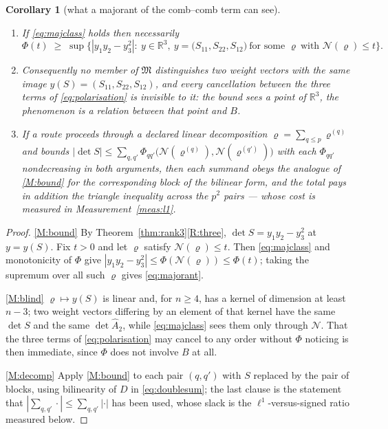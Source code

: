 \documentclass[11pt,a4paper]{article}
\theoremstyle{plain}
\newtheorem{corollary}[theorem]{Corollary}
\theoremstyle{definition}
\newcommand{\R}{\mathbb{R}}
\newcommand{\Ah}{\widehat{A}}
\begin{document}
\begin{corollary}[what a majorant of the comb--comb term can see]
\label{cor:majorant}
\begin{enumerate}[label=\textup{(\roman*)},leftmargin=2.6em]
\item\label{M:bound} If \eqref{eq:majclass} holds then necessarily
\begin{equation}
\label{eq:majorant}
  \Phi(t)\;\ge\;\sup\bigl\{|y_1y_2-y_3^{2}|:\ y\in\R^{3},\
  y=\bigl(S_{11},S_{22},S_{12}\bigr)\ \text{for some }\varrho\ \text{with }
  \mathcal N(\varrho)\le t\bigr\}.
\end{equation}
\item\label{M:blind} Consequently no member of $\mathfrak M$ distinguishes two
  weight vectors with the same image $y(S)=(S_{11},S_{22},S_{12})$, and every
  cancellation between the three terms of \eqref{eq:polarisation} is invisible
  to it: the bound sees a point of $\R^{3}$, the phenomenon is a relation
  between that point and $B$.
\item\label{M:decomp} If a route proceeds through a declared linear
  decomposition $\varrho=\sum_{q\le p}\varrho^{(q)}$ and bounds
  $|\det S|\le\sum_{q,q'}\Phi_{qq'}\bigl(\mathcal N(\varrho^{(q)}),
  \mathcal N(\varrho^{(q')})\bigr)$ with each $\Phi_{qq'}$ nondecreasing in
  both arguments, then each summand obeys the analogue of \ref{M:bound} for the
  corresponding block of the bilinear form, and the total pays in addition the
  triangle inequality across the $p^{2}$ pairs --- whose cost is measured in
  Measurement~\ref{meas:l1}.
\end{enumerate}
\end{corollary}

\begin{proof}
\ref{M:bound} By Theorem~\ref{thm:rank3}\ref{R:three}, $\det S=y_1y_2-y_3^{2}$
at $y=y(S)$. Fix $t>0$ and let $\varrho$ satisfy $\mathcal N(\varrho)\le t$.
Then \eqref{eq:majclass} and monotonicity of $\Phi$ give
$|y_1y_2-y_3^{2}|\le\Phi(\mathcal N(\varrho))\le\Phi(t)$; taking the supremum
over all such $\varrho$ gives \eqref{eq:majorant}.

\ref{M:blind} $\varrho\mapsto y(S)$ is linear and, for $n\ge4$, has a kernel of
dimension at least $n-3$; two weight vectors differing by an element of that
kernel have the same $\det S$ and the same $\det\Ah_2$, while
\eqref{eq:majclass} sees them only through $\mathcal N$. That the three terms
of \eqref{eq:polarisation} may cancel to any order without $\Phi$ noticing is
then immediate, since $\Phi$ does not involve $B$ at all.

\ref{M:decomp} Apply \ref{M:bound} to each pair $(q,q')$ with $S$ replaced by
the pair of blocks, using bilinearity of $D$ in
\eqref{eq:doublesum}; the last clause is the statement that
$|\sum_{q,q'}\cdot|\le\sum_{q,q'}|\cdot|$ has been used, whose slack is the
$\ell^{1}$-versus-signed ratio measured below.
\end{proof}
\end{document}
